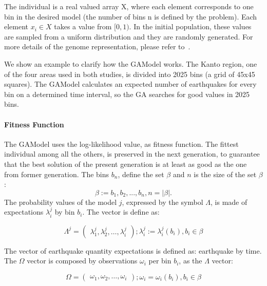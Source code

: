 The individual is a real valued array X, where each element corresponds to one bin in the desired model (the number of bins n is defined by the problem). Each element $x_i \in X$ takes a value from $[0,1)$. In the initial population, these values are sampled from a uniform distribution and they are randomly generated. For more details of the genome representation, please refer to~\cite{ecta14}.

We show an example to clarify how the GAModel works. The Kanto region, one of the four areas used in both studies, is divided into 2025 bins (a grid of 45x45 squares). The GAModel calculates an expected number of earthquakes for every bin on a determined time interval, so the GA searches for good values in 2025 bins.
\paragraph{Fitness Function}\label{fitGA}

The GAModel uses the log-likelihood value, as fitness
function. The fittest individual among all the others, is preserved in the next generation, to guarantee that the best solution of the present generation is at least as good as the one from former generation.  The bins $b_n$, define the set $\beta$ and $n$ is the size of the set $\beta$:
\begin{equation} 
\beta := {b_1,b_2,...,b_n},n = |\beta|.
\end{equation}
The probability values of the model $j$, expressed by the symbol
$\Lambda$, is made of expectations $\lambda_i^j$ by bin $b_i$. The
vector is define as:

\begin{equation}
\Lambda^j = 
\begin{pmatrix}
\lambda_1^j, 
\lambda_2^j, 
\hdots,
\lambda_i^j
\end{pmatrix}
;\lambda_i^j := \lambda_i^j(b_i),b_i \in \beta
\end{equation}

The vector of earthquake quantity expectations is defined as:
earthquake by time. The $\Omega$ vector is composed by observations
$\omega_i$ per bin $b_i$, as the $\Lambda$ vector:

\begin{equation}
\Omega = 
\begin{pmatrix}
\omega_1,
\omega_2,
\hdots,
\omega_i
\end{pmatrix}
;\omega_i =\omega_i(b_i),b_i \in \beta
\end{equation}

